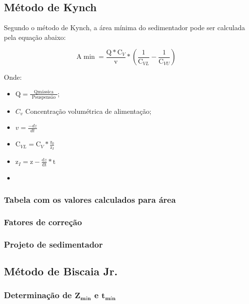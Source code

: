\subsection{Método de Kynch}

Segundo o método de Kynch, a área mínima do sedimentador pode ser calculada pela equação abaixo:

\begin{equation}\label{key}
\mathrm{A} \min =\frac{\mathrm{Q} * \mathrm{C}_{V}}{\mathrm{v}} *\left(\frac{1}{\mathrm{C}_{V L}}-\frac{1}{\mathrm{C}_{V U}}\right)
\end{equation}

Onde:

\begin{itemize}
	\item $ \mathrm{Q}=\frac{\text { Qmássica }}{\text { Psuspensäo }} $;
	\item $ C_{v}  $ Concentração volumétrica de alimentação;
	\item $ v=\frac{-d z}{d t} $
	\item $ \mathrm{C}_{V L}=\mathrm{C}_{V} * \frac{\mathrm{z}_{0}}{\mathrm{z}_{I}} $
	\item $ \mathrm{z}_{I}=\mathrm{z}-\frac{\mathrm{d} z}{\mathrm{dt}} * \mathrm{t} $
	\item 
\end{itemize}

\subsubsection{Tabela com os valores calculados para área}


\subsubsection{Fatores de correção}


\subsubsection{Projeto de sedimentador}

\subsection{Método de Biscaia Jr.}

\subsubsection{Determinação de $ \mathbf{Z_{\text{mín}}} $ e $ \mathbf{t_{\text{mín}}} $}



